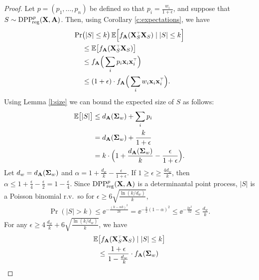 \documentclass[11pt]{article}
\begin{document}
\begin{proof}
  Let $p=(p_1,\dots,p_n)$ be defined so that $p_i =
  \frac{w_i}{1+\epsilon}$, and suppose that $S\sim
  {{\mathrm{DPP}}_{\!\mathrm{reg}}^{p}}(\mathbf X,\mathbf A)$. Then, using Corollary \ref{c:expectations}, we have
  \begin{align*}
\Pr&\big(|S|\leq k\big)\,\E\Big[f_{\A}(\X_S^\top\X_S)\mid |S|\leq k\Big]\\
&\leq
\E\big[f_{\A}(\X_S^\top\X_S)\big] \\
&\leq
f_{\A}\Big(\sum_ip_i\x_i\x_i^\top\Big)
\\ &\leq (1+\epsilon)\cdot f_{\A}\Big(\sum_iw_i\x_i\x_i^\top\Big).
  \end{align*}
  Using Lemma \ref{l:size} we can bound the expected size of $S$ as
follows:
\begin{align*}
  \mathbb E\big[|S|\big]
  &\leq d_{\mathbf A}(\mathbf{\Sigma}_w) + \sum_i p_i \\
  &=d_{\mathbf A}(\mathbf{\Sigma}_w)+\frac{k}{1+\epsilon}\\
  &=k\cdot \Big(1+\frac {d_{\mathbf A}(\mathbf{\Sigma}_w) }k - \frac{\epsilon}{1+\epsilon}\Big).
\end{align*}
Let $d_w = d_{\mathbf A}(\mathbf{\Sigma}_w)$ and $\alpha=1+\frac {d_w} k -\frac{\epsilon}{1+\epsilon}$.
If $1\geq\epsilon\geq \frac{4d_w}{k}$, then $\alpha\leq 1 +
\frac\epsilon4-\frac\epsilon2=1-\frac\epsilon4$. Since ${{\mathrm{DPP}}_{\!\mathrm{reg}}^{p}}(\mathbf X,\mathbf A)$
is a  determinantal point process, $|S|$ is a
Poisson binomial r.v.~so for $\epsilon\geq 6\sqrt{\frac{\ln(k/d_w)}{k}}$,
\begin{align*}
  \Pr(|S|>k) \leq \ee^{-\frac{(k-\alpha k)^2}{2k}} = \ee^{-\frac
  k2(1-\alpha)^2}\leq \ee^{-\frac{k\epsilon^2}{32}}\leq \frac{d_w}k.
\end{align*}
For any $\epsilon\geq
4\,\frac{d_w}k + 6\sqrt{\frac{\ln(k/d_w)}{k}}$, we have
\begin{align*}
\E&\big[f_{\A}(\X_S^\top\X_S)\mid |S|\leq k\big] \\
&\leq \frac{1+\epsilon}{1-\frac{d_w}k}\cdot f_{\A}(\Sigmab_w)\\

\end{align*}
\end{proof}
\end{document}
